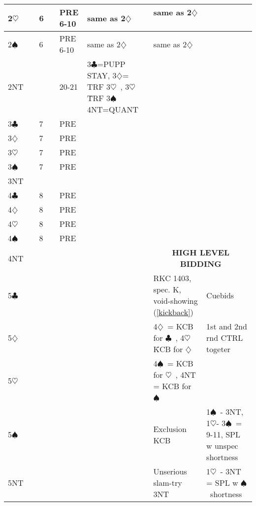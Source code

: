 \documentclass{article}
\newcommand\C{\ensuremath{\clubsuit}}
\newcommand\D{\ensuremath{\diamondsuit}}
\renewcommand\H{\ensuremath{\heartsuit}}
\renewcommand\S{\ensuremath{\spadesuit}}
\newcommand\N{{\footnotesize NT}}
\begin{document}
\begin{tabular}{| p{9mm} | p{6mm} | p{9mm} | p{9mm} | p{30mm} | p{80mm} | p{62mm} | p{46mm} |}
	2\H & &6 & &PRE 6-10 &same as 2\D\ &same as 2\D\ & \\ \hline
	2\S & &6 & &PRE 6-10 &same as 2\D\ &same as 2\D\ & \\ \hline
	2\N & & & &20-21 & 3\C =PUPP STAY, 3\D= TRF 3\H\ , 3\H\= TRF 3\S\, 4NT=QUANT & & \\ \hline
	3\C & &7 & &PRE & & & \\ \hline
	3\D & &7 & &PRE & & & \\ \hline
	3\H & &7 & &PRE & & & \\ \hline
	3\S & &7 & &PRE & & & \\ \hline
	3\N & & & & & & & \\ \hline
	4\C & &8 & &PRE & & & \\ \hline
	4\D & &8 & &PRE & & & \\ \hline
	4\H & &8 & &PRE & & & \\ \hline
	4\S & &8 & &PRE & & & \\ \hline
        4\N & & & & & &\multicolumn{2}{c}{\cellcolor[gray]{0.9} \textbf{HIGH LEVEL BIDDING}} \\ \hline
        5\C & & & & & &RKC 1403, spec. K, void-showing (\ref{kickback})   & Cuebids\\ \hline
	5\D & & & & & & 4\D\ = KCB for \C\ , 4\H\= KCB for \D\  & 1st and 2nd rnd CTRL togeter \\ \hline
	5\H & & & & & &4\S\ = KCB for \H\ , 4NT = KCB for \S\  & \\ \hline
	5\S & & & & & &Exclusion KCB  & 1\S\ - 3NT, 1\H - 3\S\  = 9-11, SPL w unspec shortness \\ \hline
	5\N & & & & & &Unserious slam-try 3NT & 1\H\ - 3NT = SPL w \S\ shortness\\ \hline
\end{tabular}

\noindent
\end{document}

